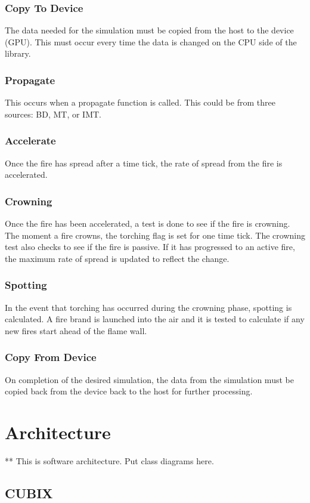 \subsubsection{Copy To Device}
The data needed for the simulation must be copied from the host to the device (GPU). This must occur every time the data is changed on the CPU side of the library. 

\subsubsection{Propagate}
This occurs when a propagate function is called. This could be from three sources: BD, MT, or IMT. 

\subsubsection{Accelerate}
Once the fire has spread after a time tick, the rate of spread from the fire is accelerated.

\subsubsection{Crowning}
Once the fire has been accelerated, a test is done to see if the fire is crowning. The moment a fire crowns, the torching flag is set for one time tick. The crowning test also checks to see if the fire is passive. If it has progressed to an active fire, the maximum rate of spread is updated to reflect the change. 

\subsubsection{Spotting}
In the event that torching has occurred during the crowning phase, spotting is calculated. A fire brand is launched into the air and it is tested to calculate if any new fires start ahead of the flame wall.

\subsubsection{Copy From Device}
On completion of the desired simulation, the data from the simulation must be copied back from the device back to the host for further processing. 


\section{Architecture}
** This is software architecture. Put class diagrams here. 
\subsection{CUBIX}
